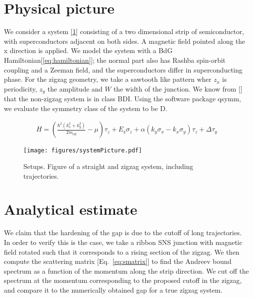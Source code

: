 \documentclass[english, twocolumn, 10pt, aps, superscriptaddress, floatfix, prb, citeautoscript]{revtex4-1}
\newcommand{\kx}{k_x}
\newcommand{\ky}{k_y}
\newcommand{\meff}{m_\text{eff}}
\begin{document}
\section{Physical picture}
We consider a system [\ref{fig:setup}] consisting of a two dimensional strip of semiconductor, with superconductors adjacent on both sides.
A magnetic field pointed along the x direction is applied.
We model the system with a BdG Hamiltonian[\ref{eq:hamiltonian}]; the normal part also has Rashba spin-orbit coupling and a Zeeman field, and the superconductors differ in superconducting phase.
For the zigzag geometry, we take a sawtooth like pattern wher $z_x$ is periodicity, $z_y$ the amplitude and $W$ the width of the junction.
We know from [\cite{pientka2017topological}] that the non-zigzag system is in class BDI.
Using the software package qsymm, we evaluate the symmetry class of the system to be D.

\begin{small}
\begin{align}
    H = \left(\frac{\hbar^2\left(\kx^2 + \ky^2\right)}{2\meff} - \mu\right)\tau_z+
        E_\text{z} \sigma_z+
        \alpha \left( \ky \sigma_x - \kx \sigma_y \right) \tau_z +
        \Delta \tau_y
\end{align}
\label{eq:hamiltonian}
\end{small}

\begin{figure}[!htb]
\texttt{[image: figures/systemPicture.pdf]}
\caption{Setups. Figure of a straight and zigzag system, including trajectories.
\label{fig:setup}}
\end{figure}

\section{Analytical estimate}
We claim that the hardening of the gap is due to the cutoff of long trajectories. 
In order to verify this is the case, we take a ribbon SNS junction with magnetic field rotated such that it corresponds to a rising section of the zigzag.
We then compute the scattering matrix [Eq.~\eqref{eq:smatrix}] to find the Andreev bound spectrum as a function of the momentum along the strip direction.
We cut off the spectrum at the momentum corresponding to the proposed cutoff in the zigzag, and compare it to the numerically obtained gap for a true zigzag system.
\end{document}
